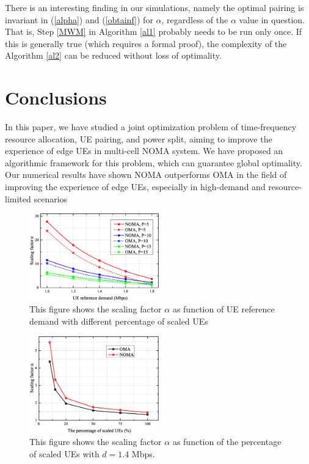 \documentclass[10pt,journal,final,finalsubmission,twocolumn]{IEEEtran}
\begin{document}
There is an interesting finding in our simulations, namely the optimal pairing is invariant in (\ref{alpha}) and (\ref{obtainf}) for $\alpha$, regardless of the $\alpha$ value in question. That is, Step \ref{MWM} in Algorithm \ref{al1} probably needs to be run only once. If this is generally true (which requires a formal proof), the complexity of the Algorithm \ref{al2} can be reduced without loss of optimality.





\section{Conclusions}\label{Sec:Conclusions}

In this paper, we have studied a joint optimization problem of time-frequency resource allocation, UE pairing, and power split, aiming to improve the experience of edge UEs in multi-cell NOMA system. We have proposed an algorithmic framework for this problem, which can guarantee global optimality. Our numerical results have shown NOMA outperforms OMA in the field of improving the experience of edge UEs, especially in high-demand and resource-limited scenarios




\begin{figure}
\centering
\includegraphics[width=0.5\textwidth]{1.eps}
\caption{This figure shows the scaling factor $\alpha$ as function of UE reference demand with different percentage of scaled UEs}
\label{1}
\end{figure}

\begin{figure}
\centering
\includegraphics[width=0.5\textwidth]{2.eps}
\caption{This figure shows the scaling factor $\alpha$ as function of the percentage of scaled UEs with $d=1.4$ Mbps.}
\label{2}
\end{figure}
\end{document}
